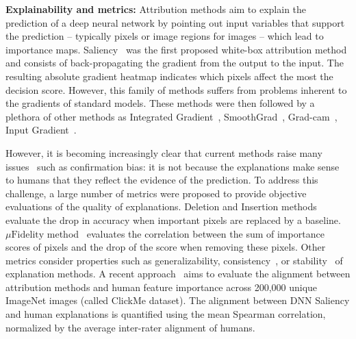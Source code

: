 \textbf{Explainability and metrics:} 
Attribution methods aim to explain the prediction of a deep neural network by pointing out input variables that support the prediction -- typically pixels or image regions for images -- which lead to importance maps.
Saliency~\cite{SimonyanVZ13} was the first proposed white-box attribution method and consists of back-propagating the gradient from the output to the input. The resulting absolute gradient heatmap indicates which pixels affect the most the decision score.
However, this family of methods suffers from problems inherent to the gradients of standard models. These methods were then followed by a plethora of other methods as Integrated Gradient~\cite{Sundararajan2017}, SmoothGrad~\cite{Smilkov2017}, Grad-cam~\cite{Selvaraju_2019}, Input Gradient~\cite{ancona18GradInput}.


However, it is becoming increasingly clear that current methods raise many issues~\cite{Adebayo18Sanity, Heo19foolingInterpretation, sixt2020explanations} such as confirmation bias: it is not because the explanations make sense to humans that they reflect the evidence of the prediction. 
To address this challenge, a large number of metrics were proposed to provide objective evaluations of the quality of explanations. Deletion and Insertion methods~\cite{petsiuk18Rise} evaluate the drop in accuracy when important pixels are replaced by a baseline. $\mu\text{Fidelity}$ method~\cite{Bhatt20muFidelity} evaluates the correlation between the sum of importance scores of pixels and the drop of the score when removing these pixels.
Other metrics 
consider properties such as generalizability, consistency~\cite{felHowGood22}, or stability~\cite{Yeh19InfidelityExplain,Bhatt20muFidelity} of explanation methods.
A recent approach~\cite{linsley2017visual} aims to evaluate the alignment between attribution methods and human feature importance across 200,000 unique ImageNet images (called ClickMe dataset). The alignment between DNN Saliency and human explanations is quantified using the mean Spearman correlation, normalized by the average inter-rater alignment of humans.


